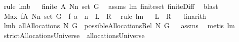 \begin{isabellebody}
\ {\isacharparenleft}rule\ lm{}{}b{\isacharparenright}\isanewline
{}\isamarkupfalse%
\ \isamarkupfalse%
\ {\isachardoublequoteopen}finite\ {\isacharparenleft}{\isacharquery}A\ {\isacharparenleft}N{\isacharminus}{\isacharbraceleft}n{\isacharbraceright}{\isacharparenright}\ {\isacharparenleft}set\ G{\isacharparenright}{\isacharparenright}{\isachardoublequoteclose}\ \isamarkupfalse%
\ assms{\isacharparenleft}{}{\isacharparenright}\ lm{}{}\ finite{\isacharunderscore}set\ finite{\isacharunderscore}Diff\ \isamarkupfalse%
\ blast\isanewline
{}\isamarkupfalse%
\ \isamarkupfalse%
\ {\isachardoublequoteopen}Max\ {\isacharparenleft}{\isacharquery}f{\isacharbackquote}{\isacharparenleft}{\isacharquery}A\ {\isacharparenleft}N{\isacharminus}{\isacharbraceleft}n{\isacharbraceright}{\isacharparenright}\ {\isacharparenleft}set\ G{\isacharparenright}{\isacharparenright}{\isacharparenright}\ {\isasymge}\ {\isacharquery}f\ {\isacharparenleft}{\isacharquery}a\ {\isacharminus}{\isacharminus}\ n{\isacharparenright}{\isachardoublequoteclose}\ {\isacharparenleft}\ {\isachardoublequoteopen}{\isacharquery}L\ {\isachargreater}{\isacharequal}\ {\isacharquery}R{\isachardoublequoteclose}{\isacharparenright}\ \isamarkupfalse%
\ {\isacharparenleft}rule\ lm{}{}{\isacharparenright}\isanewline
{}\isamarkupfalse%
\ \isamarkupfalse%
\ {\isachardoublequoteopen}{\isacharquery}L\ {\isacharminus}\ {\isacharquery}R\ {\isachargreater}{\isacharequal}{}{\isachardoublequoteclose}\ \isamarkupfalse%
\ linarith\isanewline
{}\isamarkupfalse%
%
\endisatagproof
{\isafoldproof}%
%
\isadelimproof
\isanewline
%
\endisadelimproof
\isanewline
{}\isamarkupfalse%
\ lm{}{}b{\isacharcolon}\ {\isachardoublequoteopen}allAllocations\ N\ G\ {\isacharequal}\ possibleAllocationsRel\ N\ G{\isachardoublequoteclose}%
\isadelimproof
\ %
\endisadelimproof
%
\isatagproof
{}\isamarkupfalse%
\ assms\ \isamarkupfalse%
\ {\isacharparenleft}metis\ lm{}{}{\isacharparenright}%
\endisatagproof
{\isafoldproof}%
%
\isadelimproof
%
\endisadelimproof
\isanewline
{}\isamarkupfalse%
\ {\isachardoublequoteopen}strictAllocationsUniverse\ {\isacharequal}{\isacharequal}\ allocationsUniverse{\isachardoublequoteclose}\isanewline
\isanewline
{}\isamarkupfalse%

\end{isabellebody}
